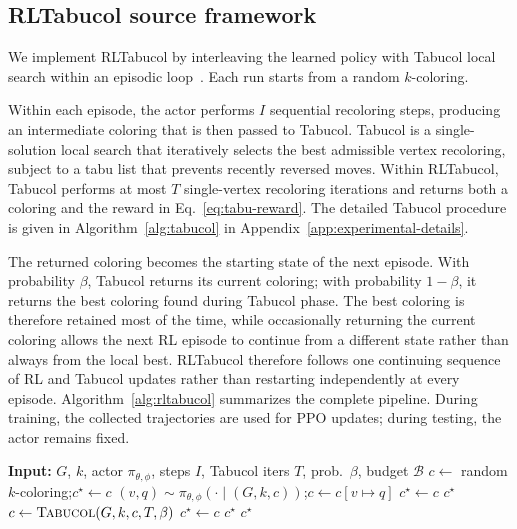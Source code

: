 \subsection{RLTabucol source framework}
\label{ssec:rltabucol}

We implement RLTabucol by interleaving the learned policy with Tabucol local search within an episodic loop~\cite{cai2019rlho,frijters2023rltabucol}. Each run starts from a random $k$-coloring. 

Within each episode, the actor performs $I$ sequential recoloring steps, producing an intermediate coloring that is then passed to Tabucol. Tabucol is a single-solution local search that iteratively selects the best admissible vertex recoloring, subject to a tabu list that prevents recently reversed moves. Within RLTabucol, Tabucol performs at most $T$ single-vertex recoloring iterations and returns both a coloring and the reward in Eq.~\eqref{eq:tabu-reward}. The detailed Tabucol procedure is given in Algorithm~\ref{alg:tabucol} in Appendix~\ref{app:experimental-details}.

The returned coloring becomes the starting state of the next episode. With probability $\beta$, Tabucol returns its current coloring; with probability $1-\beta$, it returns the best coloring found during Tabucol phase. The best coloring is therefore retained most of the time, while occasionally
returning the current coloring allows the next RL episode to continue from a
different state rather than always from the local best.  RLTabucol therefore follows one continuing sequence of RL and Tabucol updates rather than restarting independently at every episode. Algorithm~\ref{alg:rltabucol} summarizes the complete pipeline. During training, the collected trajectories are used for PPO updates; during testing, the actor remains fixed.

\begin{algorithm}[t]
\caption{The RLTabucol pipeline}
\label{alg:rltabucol}
\begin{algorithmic}[1]
\State \textbf{Input:} $G$, $k$, actor $\pi_{\theta,\phi}$, steps $I$,
Tabucol iters $T$, prob.\ $\beta$, budget $\mathcal{B}$
\State $c\leftarrow$ random $k$-coloring;\quad $c^\star\leftarrow c$
    \State $(v,q)\sim\pi_{\theta,\phi}(\cdot\mid(G,k,c))$;\quad $c\leftarrow c[v\mapsto q]$
     \State $c^\star\leftarrow c$ \EndIf
     \State \Return $c^\star$ \EndIf
  \EndFor
  \State $c\leftarrow\textsc{Tabucol}(G,k,c,T,\beta)$
   \State $c^\star\leftarrow c$ \EndIf
   \State \Return $c^\star$ \EndIf
\EndWhile
\State \Return $c^\star$
\end{algorithmic}
\end{algorithm}

